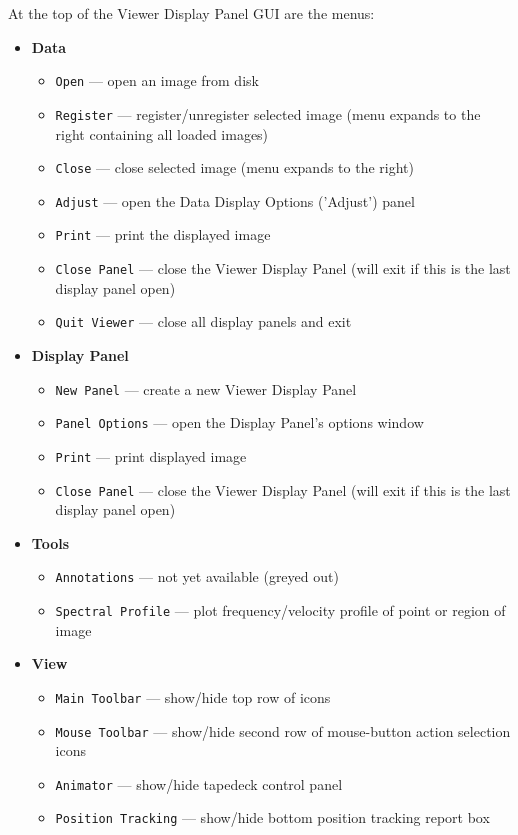 At the top of the Viewer Display Panel GUI are the menus:
\begin{itemize}
\item {\bf Data}
  \begin{itemize}
      \item  {\tt Open} --- open an image from disk
      \item  {\tt Register} --- register/unregister selected image (menu
             expands to the right containing all loaded images) 
      \item  {\tt Close} --- close selected image (menu expands to the right)
      \item  {\tt Adjust} --- open the Data Display Options ('Adjust') panel 
      \item  {\tt Print} --- print the displayed image
      \item  {\tt Close Panel} --- close the Viewer Display Panel (will exit if
             this is the last display panel open)
      \item  {\tt Quit Viewer} --- close all display panels and exit
  \end{itemize}
\item {\bf Display Panel}
  \begin{itemize}
      \item {\tt New Panel} --- create a new Viewer Display Panel
      \item {\tt Panel Options} --- open the Display Panel's options window
      \item {\tt Print} --- print displayed image
      \item {\tt Close Panel} --- close the Viewer Display Panel (will exit if
            this is the last display panel open)
  \end{itemize}
\item {\bf Tools}
  \begin{itemize}
      \item {\tt Annotations} --- not yet available (greyed out) 
      \item {\tt Spectral Profile} --- plot frequency/velocity profile
                 of point or region of image
  \end{itemize}
\item {\bf View}
  \begin{itemize}
      \item {\tt Main Toolbar} --- show/hide top row of icons
      \item {\tt Mouse Toolbar} --- show/hide second row of
                 mouse-button action selection icons
      \item {\tt Animator} --- show/hide tapedeck control panel
      \item {\tt Position Tracking} --- show/hide bottom position
                 tracking report box  
  \end{itemize}
\end{itemize}

